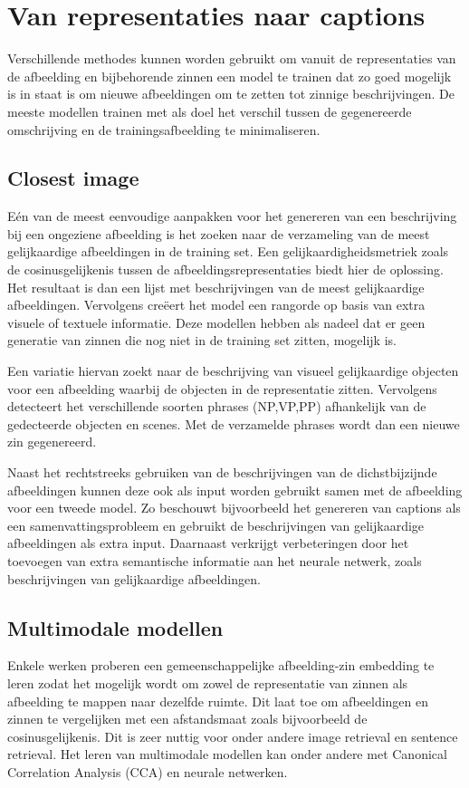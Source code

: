 \section{Van representaties naar captions}
Verschillende methodes kunnen worden gebruikt om vanuit de representaties van de afbeelding en bijbehorende zinnen een model te trainen dat zo goed mogelijk is in staat is om nieuwe afbeeldingen om te zetten tot zinnige beschrijvingen. De meeste modellen trainen met als doel het verschil tussen de gegenereerde omschrijving en de trainingsafbeelding te minimaliseren.

\subsection{Closest image}
E\'en van de meest eenvoudige aanpakken voor het genereren van een beschrijving bij een ongeziene afbeelding is het zoeken naar de verzameling van de meest gelijkaardige afbeeldingen in de training set. Een gelijkaardigheidsmetriek zoals de cosinusgelijkenis tussen de afbeeldingsrepresentaties biedt hier de oplossing. Het resultaat is dan een lijst met beschrijvingen van de meest gelijkaardige afbeeldingen. Vervolgens cre\"eert het model een rangorde op basis van extra visuele of textuele informatie.\cite{Ordonez}\cite{Oliva}\cite{Torralba}\cite{Devlin}
Deze modellen hebben als nadeel dat er geen generatie van zinnen die nog niet in de training set zitten, mogelijk is.

Een variatie hiervan \cite{Kuznetsova}\cite{Gupta} zoekt naar de beschrijving van visueel gelijkaardige objecten voor een afbeelding waarbij de objecten in de representatie zitten. Vervolgens detecteert het verschillende soorten phrases (NP,VP,PP) afhankelijk van de gedecteerde objecten en scenes. Met de verzamelde phrases wordt dan een nieuwe zin gegenereerd.

Naast het rechtstreeks gebruiken van de beschrijvingen van de dichstbijzijnde afbeeldingen kunnen deze ook als input worden gebruikt samen met de afbeelding voor een tweede model. \cite{Mason} Zo beschouwt \cite{Mason} bijvoorbeeld het genereren van captions als een samenvattingsprobleem en gebruikt de beschrijvingen van gelijkaardige afbeeldingen als extra input. Daarnaast verkrijgt \cite{Xu} verbeteringen door het toevoegen van extra semantische informatie aan het neurale netwerk, zoals beschrijvingen van gelijkaardige afbeeldingen.
 
\subsection{Multimodale modellen}
Enkele werken proberen een gemeenschappelijke afbeelding-zin embedding te leren zodat het mogelijk wordt om zowel de representatie van zinnen als afbeelding te mappen naar dezelfde ruimte. Dit laat toe om afbeeldingen en zinnen te vergelijken met een afstandsmaat zoals bijvoorbeeld de cosinusgelijkenis. Dit is zeer nuttig voor onder andere image retrieval en sentence retrieval. Het leren van multimodale modellen kan onder andere met Canonical Correlation Analysis (CCA)\cite{Hodosh} en neurale netwerken. \cite{Mao}\cite{Karpathy 1}\cite{Fang}

